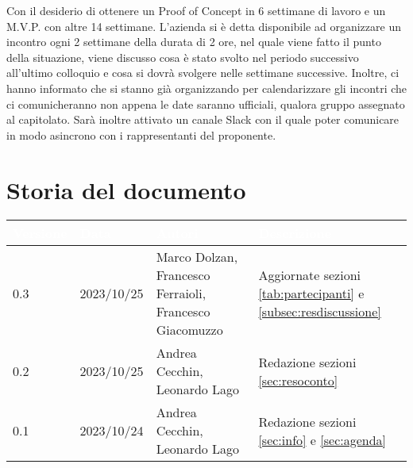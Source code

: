 \documentclass[12pt]{article}
\begin{document}
\begin{enumerate}
Con il desiderio di ottenere un Proof of Concept in 6 settimane di lavoro e un M.V.P. con altre 14 settimane. L'azienda si è detta disponibile ad organizzare un incontro ogni 2 settimane della durata di 2 ore, nel quale viene fatto il punto della situazione, viene discusso cosa è stato svolto nel periodo successivo all'ultimo colloquio e cosa si dovrà svolgere nelle settimane successive. Inoltre, ci hanno informato che si stanno già organizzando per calendarizzare gli incontri che ci comunicheranno non appena le date saranno ufficiali, qualora gruppo assegnato al capitolato.
Sarà inoltre attivato un canale Slack con il quale poter comunicare in modo asincrono con i rappresentanti del proponente.
    
\end{enumerate}

\section{Storia del documento} \label{sec:storia}
\begingroup
\setlength{\tabcolsep}{10pt}
\renewcommand{\arraystretch}{1.5}
\begin{tabularx}{\textwidth}{| l | l | X | X |}
    \hline
    \rowcolor{headerrow} \textbf{\textcolor{white}{Versione}} & \textbf{\textcolor{white}{Data}} & \textbf{\textcolor{white}{Autori}} & \textbf{\textcolor{white}{Descrizione}} \\
    \hline
    0.3 & 2023/10/25 &Marco Dolzan, Francesco Ferraioli, Francesco Giacomuzzo & Aggiornate sezioni \ref{tab:partecipanti} e \ref{subsec:resdiscussione} \\
    \hline
    0.2 & 2023/10/25 & Andrea Cecchin, Leonardo Lago & Redazione sezioni \ref{sec:resoconto} \\
    \hline
    0.1 & 2023/10/24 & Andrea Cecchin, Leonardo Lago  & Redazione sezioni \ref{sec:info} e \ref{sec:agenda}\\
    \hline
    
    
   
\end{tabularx}
\endgroup
\end{document}
